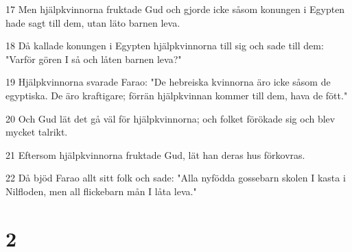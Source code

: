 \par 17 Men hjälpkvinnorna fruktade Gud och gjorde icke såsom konungen i Egypten hade sagt till dem, utan läto barnen leva.
\par 18 Då kallade konungen i Egypten hjälpkvinnorna till sig och sade till dem: "Varför gören I så och låten barnen leva?"
\par 19 Hjälpkvinnorna svarade Farao: "De hebreiska kvinnorna äro icke såsom de egyptiska. De äro kraftigare; förrän hjälpkvinnan kommer till dem, hava de fött."
\par 20 Och Gud lät det gå väl för hjälpkvinnorna; och folket förökade sig och blev mycket talrikt.
\par 21 Eftersom hjälpkvinnorna fruktade Gud, lät han deras hus förkovras.
\par 22 Då bjöd Farao allt sitt folk och sade: "Alla nyfödda gossebarn skolen I kasta i Nilfloden, men all flickebarn mån I låta leva."

\chapter{2}

